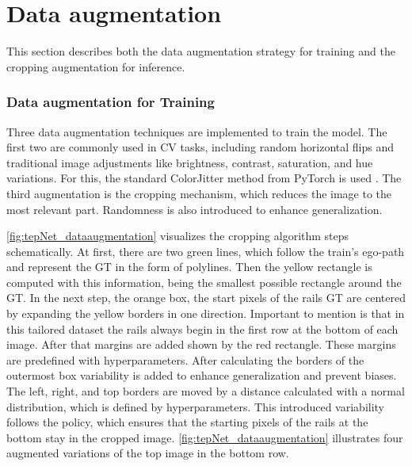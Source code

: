 \section{Data augmentation}
\label{sec:dataaugmentation}

This section describes both the data augmentation strategy for training and the cropping augmentation for inference.

\subsubsection{Data augmentation for Training}

Three data augmentation techniques are implemented to train the model.
The first two are commonly used in CV tasks, including random horizontal flips and traditional image adjustments like brightness, contrast, saturation, and hue variations.
For this, the standard ColorJitter method from PyTorch is used \cite{pytorch_colorJitter_docu}.
The third augmentation is the cropping mechanism, which reduces the image to the most relevant part.
Randomness is also introduced to enhance generalization.

\autoref{fig:tepNet_dataaugmentation} visualizes the cropping algorithm steps schematically.
At first, there are two green lines, which follow the train's ego-path and represent the \ac{GT} in the form of polylines.
Then the yellow rectangle is computed with this information, being the smallest possible rectangle around the \ac{GT}.
In the next step, the orange box, the start pixels of the rails \ac{GT} are centered by expanding the yellow borders in one direction.
Important to mention is that in this tailored dataset the rails always begin in the first row at the bottom of each image.
After that margins are added shown by the red rectangle.
These margins are predefined with hyperparameters.
After calculating the borders of the outermost box variability is added to enhance generalization and prevent biases.
The left, right, and top borders are moved by a distance calculated with a normal distribution, which is defined by hyperparameters.
This introduced variability follows the policy, which ensures that the starting pixels of the rails at the bottom stay in the cropped image.
\autoref{fig:tepNet_dataaugmentation} illustrates four augmented variations of the top image in the bottom row.


